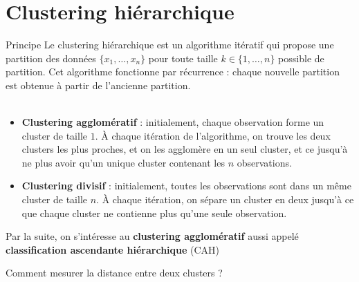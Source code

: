 \documentclass[10pt]{beamer}
\newcommand{\hsp}{\hspace*{1em}}
\begin{document}
\section{Clustering hiérarchique}
\begin{frame}{Principe}
	\vspace*{-0,4em}
Le clustering hiérarchique est un algorithme itératif qui propose une partition des données $\{x_1,\dots,x_n\}$ pour toute taille $k \in \{1,\dots,n\}$ possible de partition. Cet algorithme fonctionne par récurrence : chaque nouvelle partition est obtenue à partir de l'ancienne partition.\\[0.9em]

\\[0.5em]

\begin{itemize}
	\item \textbf{Clustering agglomératif} : initialement, chaque observation forme un cluster de taille $1$. À chaque itération de l’algorithme, on trouve
	les deux clusters les plus proches, et on les agglomère en un seul cluster, et ce jusqu’à ne plus avoir qu’un	unique cluster contenant les $n$ observations.\\[1em]
	\item \textbf{Clustering divisif} : initialement, toutes les observations sont dans un même cluster de taille $n$. À chaque itération, on sépare un cluster en deux jusqu’à ce que chaque cluster ne contienne plus qu’une seule observation.\\[0.9em]
\end{itemize}
\begin{valblock}{}
	Par la suite, on s'intéresse au \textbf{clustering agglomératif} aussi appelé \textbf{classification ascendante hiérarchique} (CAH)
	\end{valblock}

\vspace*{-0.5em}
 \hsp Comment mesurer la distance entre deux clusters ?\\[1em]
\end{frame}
\end{document}
